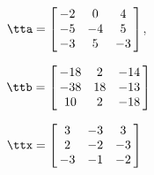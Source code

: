 {$\tta = \left[\hskip -3pt \begin{array}{ccc} -2&0&4 \\    -5&-4&5 \\    -3&5&-3\end{array}\hskip -3pt \right] $, 

$\ttb=\left[\hskip -3pt \begin{array}{ccc} -18&2&-14\\    -38&18&-13 \\    10&2&-18  \end{array}\hskip -3pt \right] $}
{$\ttx=\left[\hskip -3pt \begin{array}{ccc} 3&-3&3\\    2&-2&-3 \\    -3&-1&-2  \end{array}\hskip -3pt \right] $}
